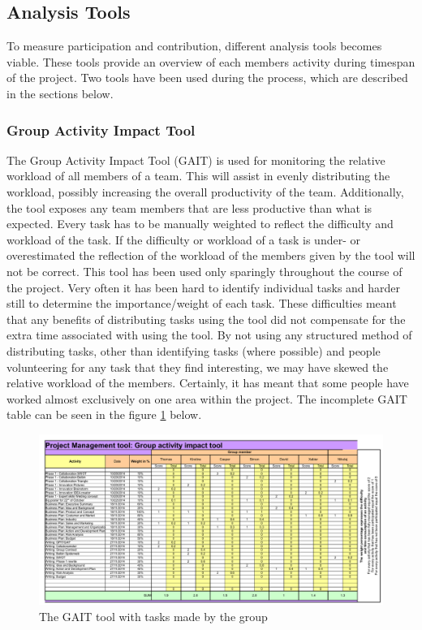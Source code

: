 \subsection{Analysis Tools}
To measure participation and contribution, different analysis tools becomes viable. These tools provide an overview of each members activity during timespan of the project. Two tools have been used during the process, which are described in the sections below.

\subsubsection{Group Activity Impact Tool}
 The Group Activity Impact Tool (GAIT) is used for monitoring the relative workload of all members of a team. This will assist in evenly distributing the workload, possibly increasing the overall productivity of the team. Additionally, the tool exposes any team members that are less productive than what is expected. Every task has to be manually weighted to reflect the difficulty and workload of the task. If the difficulty or workload of a task is under- or overestimated the reflection of the workload of the members given by the tool will not be correct.
This tool has been used only sparingly throughout the course of the project. Very often it has been hard to identify individual tasks and harder still to determine the importance/weight of each task. These difficulties meant that any benefits of distributing tasks using the tool did not compensate for the extra time associated with using the tool. 
 By not using any structured method of distributing tasks, other than identifying tasks (where possible) and people volunteering for any task that they find interesting, we may have skewed the relative workload of the members. Certainly, it has meant that some people have worked almost exclusively on one area within the project. The incomplete GAIT table can be seen in the figure \ref{fig:GAIT} below.

\begin{landscape}
	\begin{figure}[h!]
		\includegraphics[scale=1.25]{./graphics/GAIT}
		\caption{The GAIT tool with tasks made by the group}
		\label{fig:GAIT}
	\end{figure}
\end{landscape}

